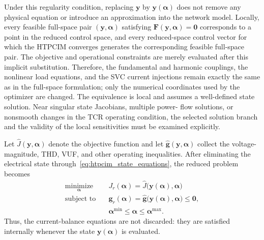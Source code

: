 \documentclass[journal]{IEEEtran}
\begin{document}
Under this regularity condition, replacing $\bm{y}$ by
$\bm{y}(\bm{\alpha})$ does not remove any physical equation or introduce an
approximation into the network model. Locally, every feasible full-space
pair $(\bm{y},\bm{\alpha})$ satisfying
$\bm{F}(\bm{y},\bm{\alpha})=\bm{0}$ corresponds to a point in the reduced
control space, and every reduced-space control vector for which the HTPCIM
converges generates the corresponding feasible full-space pair. The
objective and operational constraints are merely evaluated after this
implicit substitution. Therefore, the fundamental and harmonic couplings,
the nonlinear load equations, and the SVC current injections remain exactly
the same as in the full-space formulation; only the numerical coordinates
used by the optimizer are changed. The equivalence is local and assumes a
well-defined state solution. Near singular state Jacobians, multiple power-
flow solutions, or nonsmooth changes in the TCR operating condition, the
selected solution branch and the validity of the local sensitivities must be
examined explicitly.

Let $\widehat{J}(\bm{y},\bm{\alpha})$ denote the objective function and let
$\widehat{\bm{g}}(\bm{y},\bm{\alpha})$ collect the voltage-magnitude, THD,
VUF, and other operating inequalities. After eliminating the electrical
state through~\eqref{eq:htpcim_state_equations}, the reduced problem becomes
\begin{equation}
\begin{aligned}
    \underset{\bm{\alpha}}{\operatorname{minimize}}\quad
    &J_r(\bm{\alpha})
      =\widehat{J}\bigl(\bm{y}(\bm{\alpha}),\bm{\alpha}\bigr)\\
    \text{subject to}\quad
    &\bm{g}_r(\bm{\alpha})
      =\widehat{\bm{g}}\bigl(\bm{y}(\bm{\alpha}),\bm{\alpha}\bigr)
      \leq\bm{0},\\
    &\bm{\alpha}^{\min}\leq\bm{\alpha}\leq\bm{\alpha}^{\max}.
\end{aligned}
\label{eq:reduced_optimization_problem}
\end{equation}
Thus, the current-balance equations are not discarded: they are satisfied
internally whenever the state $\bm{y}(\bm{\alpha})$ is evaluated.
\end{document}
